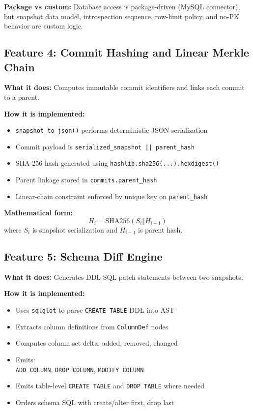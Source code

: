 \documentclass[12pt, a4paper]{article}
\begin{document}
\textbf{Package vs custom:}
Database access is package-driven (MySQL connector), but snapshot data model,
introspection sequence, row-limit policy, and no-PK behavior are custom logic.

\subsection{Feature 4: Commit Hashing and Linear Merkle Chain}

\textbf{What it does:}
Computes immutable commit identifiers and links each commit to a parent.

\textbf{How it is implemented:}
\begin{itemize}[leftmargin=1.5em]
    \item \texttt{snapshot\_to\_json()} performs deterministic JSON serialization
    \item Commit payload is \texttt{serialized\_snapshot || parent\_hash}
    \item SHA-256 hash generated using \texttt{hashlib.sha256(...).hexdigest()}
    \item Parent linkage stored in \texttt{commits.parent\_hash}
    \item Linear-chain constraint enforced by unique key on \texttt{parent\_hash}
\end{itemize}

\textbf{Mathematical form:}
\[
H_i = \mathrm{SHA256}(S_i \Vert H_{i-1})
\]
where $S_i$ is snapshot serialization and $H_{i-1}$ is parent hash.

\subsection{Feature 5: Schema Diff Engine}

\textbf{What it does:}
Generates DDL SQL patch statements between two snapshots.

\textbf{How it is implemented:}
\begin{itemize}[leftmargin=1.5em]
    \item Uses \texttt{sqlglot} to parse \texttt{CREATE TABLE} DDL into AST
    \item Extracts column definitions from \texttt{ColumnDef} nodes
    \item Computes column set delta: added, removed, changed
    \item Emits:\\
    \texttt{ADD COLUMN}, \texttt{DROP COLUMN}, \texttt{MODIFY COLUMN}
    \item Emits table-level \texttt{CREATE TABLE} and \texttt{DROP TABLE} where needed
    \item Orders schema SQL with create/alter first, drop last
\end{itemize}
\end{document}
